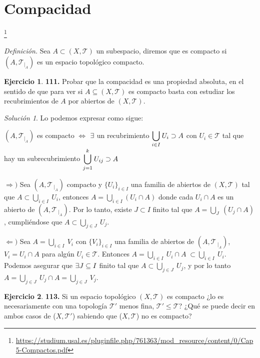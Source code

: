 \documentclass[12pt,twoside]{report}
\newcommand\mc[1]{\mathcal{#1}}
\theoremstyle{azul}
\theoremstyle{azul2}
\theoremstyle{plain}
\theoremstyle{definition}
\newtheorem*{ejern}{Ejercicio}
\theoremstyle{remark}
\newtheorem*{sol}{Solución}
\begin{document}
\section{Compacidad} \vspace{-15mm} \hfill \footnote{\url{https://studium.usal.es/pluginfile.php/761363/mod_resource/content/0/Cap5-Compactos.pdf}}

\textit{Definición.} Sea $A \subset (X, \mc{T})$ un subespacio, diremos que es compacto si $(A, \mc{T}_{|_A})$ es un espacio topológico compacto. 
\; 
\begin{ejern} \textbf{111.} Probar que la compacidad es una propiedad absoluta, en el sentido de que para ver si $A \subseteq (X, \mc{T})$ es compacto basta con estudiar los recubrimientos de $A$ por abiertos de $(X, \mc{T})$.
\end{ejern}
\begin{sol} Lo podemos expresar como sigue:

$(A, \mc{T}_{|_A})$ es compacto $\Leftrightarrow$  $\mathlarger{\exists} $ un recubrimiento $ \underset{i \in I}{{\mathlarger{\bigcup}}} \: U_i \supset A $ con $U_i \in \mc{T}$ tal que hay un subrecubrimiento $ \overset{k}{\underset{j=1}{\mathlarger{\bigcup}}} \: U_{ij}  \supset A$

$\Rightarrow)$ Sea $(A, \mc{T}_{\: |_A})$ compacto y $\{U_i\}_{i \in I}$ una familia de abiertos de $(X, \mc{T})$ tal que $A \subset  \underset{i \in I}{{{\bigcup}}} \: U_i$, entonces $A= \underset{i \in I}{\bigcup}(U_i \cap A)$ donde cada $U_i \cap A$ es un abierto de $(A, \mc{T}_{\:|_A})$. Por lo tanto, existe $J \subset I$ finito tal que $A=\underset{J}{\bigcup}\: (U_j \cap A)$, cumpli{\'e}ndose que $A \subset \underset{j \in J}{\bigcup} \: U_j$.

$\Leftarrow)$ Sea $A=\underset{i \in I}{\bigcup} \: V_i$ con $\{V_i\}_{i \in I}$ una familia de abiertos de $(A, \mc{T}_{\:|_A})$, $V_i=U_i \cap A$ para alg{\'u}n $U_i \in \mc{T}$. Entonces $A=\underset{i \in I}{\bigcup} \: U_i \cap A \; \subset \underset{i \in I}{\bigcup} \: U_i$. Podemos asegurar que $\mathlarger{\exists} J \subseteq I$ finito tal que $A \subset \underset{j \in J}{\bigcup} \: U_j$, y por lo tanto $A=  \underset{j \in J}{\bigcup} \: U_j \cap A = \underset{j \in J}{\bigcup} \: V_j$.
\end{sol}
\; \vspace{-5mm}
\begin{ejern} \textbf{113.}
Si un espacio topológico $(X, \mc{T})$ es compacto ¿lo es necesariamente con una topología $\mc{T}'$ menos fina, $\mc{T}' \leq \mc{T}$? ¿Qu{\'e} se puede decir en ambos casos de ($X, \mc{T}'$) sabiendo que
($X, \mc{T}$) no es compacto?
\end{ejern}
\end{document}
